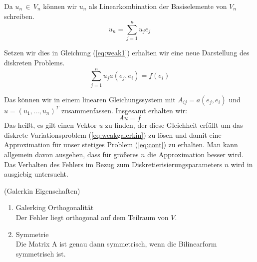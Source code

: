 Da $u_n \, \in \, V_n$ können wir $u_n$ als Linearkombination der Basiselemente von $V_n$ schreiben.
\begin{equation}
u_n = \sum_{j=1}^{n} u_j e_j
\end{equation}

Setzen wir dies in Gleichung (\ref{eq:weak1}) erhalten wir eine neue Darstellung des diskreten Problems.
\begin{equation}
\sum_{j=1}^{n} u_j a( e_j, e_i ) = f(e_i)
\end{equation}

Das können wir in einem linearen Gleichungssystem mit $A_{ij}=a(e_j,e_i)$ und $u=(u_1,\dots,u_n)^{T}$ zusammenfassen. Insgesamt erhalten wir:
\begin{equation}
Au=f
\end{equation}
Das heißt, es gilt einen Vektor $u$ zu finden, der diese Gleichheit erfüllt um das diskrete Variationsproblem (\ref{eq:weakgalerkin}) zu lösen und damit eine Approximation für unser stetiges Problem (\ref{eq:cont}) zu erhalten. Man kann allgemein davon ausgehen, dass für größeres $n$ die Approximation besser wird. Das Verhalten des Fehlers im Bezug zum Diskretierisierungsparameters $n$ wird in \cite[154]{Numerik} ausgiebig untersucht.

\newpage

\begin{Bemerkung} (Galerkin Eigenschaften) 
\begin{enumerate} 
\item Galerking Orthogonalität \\
Der Fehler liegt orthogonal auf dem Teilraum von $V$.
\item Symmetrie \\
Die Matrix A ist genau dann symmetrisch, wenn die Bilinearform symmetrisch ist.
\end{enumerate}
\end{Bemerkung}

